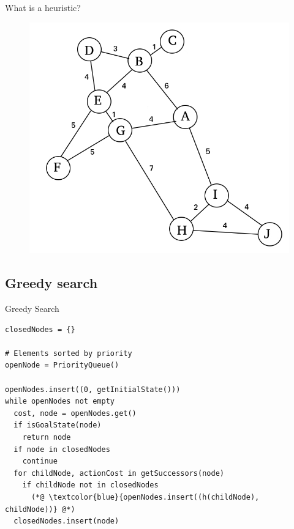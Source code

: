\documentclass{beamer}
\begin{document}
\begin{frame}{What is a heuristic?}
	\begin{figure}
	\centering
		\includegraphics[width=0.7\linewidth]{example_weights.jpg}
	\end{figure}
\end{frame}

\subsection{Greedy search}

\begin{frame}[fragile]{Greedy Search}
	\begin{lstlisting}
closedNodes = {}

# Elements sorted by priority
openNode = PriorityQueue()

openNodes.insert((0, getInitialState()))
while openNodes not empty 
  cost, node = openNodes.get()
  if isGoalState(node)
    return node
  if node in closedNodes
    continue				
  for childNode, actionCost in getSuccessors(node)
    if childNode not in closedNodes
      (*@ \textcolor{blue}{openNodes.insert((h(childNode), childNode))} @*)
  closedNodes.insert(node)
	\end{lstlisting}
\end{frame}
\end{document}
